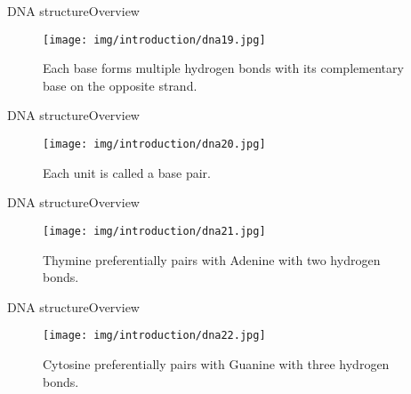 \documentclass[10pt]{beamer}
\newcommand{\1}{
	\setbeamertemplate{background}{
		\texttt{[image: img/1]}
		\tikz[overlay] \fill[fill opacity=0.75,fill=white] (0,0) rectangle (-\paperwidth,\paperheight);
	}
}
\begin{document}
\begin{frame}{DNA structure}{Overview}
	\begin{figure}[]
		\centering
		\texttt{[image: img/introduction/dna19.jpg]}
		\label{img:mot2}
		\caption{Each base forms multiple hydrogen bonds with its complementary base on the opposite strand.}
	\end{figure}
\end{frame}

\begin{frame}{DNA structure}{Overview}
	\begin{figure}[]
		\centering
		\texttt{[image: img/introduction/dna20.jpg]}
		\label{img:mot2}
		\caption{Each unit is called a base pair.}
	\end{figure}
\end{frame}

\begin{frame}{DNA structure}{Overview}
	\begin{figure}[]
		\centering
		\texttt{[image: img/introduction/dna21.jpg]}
		\label{img:mot2}
		\caption{Thymine preferentially pairs with Adenine with two hydrogen bonds.}
	\end{figure}
\end{frame}

\begin{frame}{DNA structure}{Overview}
	\begin{figure}[]
		\centering
		\texttt{[image: img/introduction/dna22.jpg]}
		\label{img:mot2}
		\caption{Cytosine preferentially pairs with Guanine with three hydrogen bonds.}
	\end{figure}
\end{frame}
\end{document}
